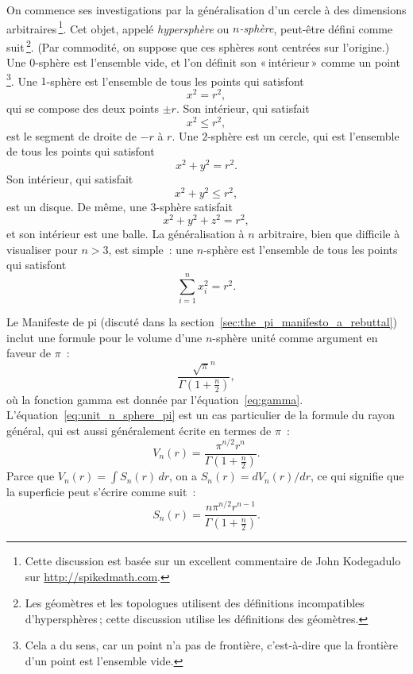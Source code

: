 On commence ses investigations par la généralisation d'un cercle à des dimensions arbitraires\,\footnote{Cette discussion est basée sur un excellent commentaire de John Kodegadulo sur \url{http://spikedmath.com}.}. Cet objet, appelé \emph{hypersphère} ou \emph{$n$-sphère}, peut-être défini comme suit\,\footnote{Les géomètres et les topologues utilisent des définitions incompatibles d'hypersphères\,; cette discussion utilise les définitions des géomètres.}. (Par commodité, on suppose que ces sphères sont centrées sur l'origine.) Une $0$-sphère est l'ensemble vide, et l'on définit son «\,intérieur\,» comme un point\,\footnote{Cela a du sens, car un point n'a pas de frontière, c'est-à-dire que la frontière d'un point est l'ensemble vide.}. Une $1$-sphère est l'ensemble de tous les points qui satisfont
\[
x^2 = r^2,
\]
qui se compose des deux points $\pm r$. Son intérieur, qui satisfait
\[
x^2 \leq r^2,
\]
est le segment de droite de $-r$ à $r$. Une $2$-sphère est un cercle, qui est l'ensemble de tous les points qui satisfont
\[
x^2 + y^2 = r^2.
\]
Son intérieur, qui satisfait
\[
x^2 + y^2 \leq r^2,
\]
est un disque. De même, une $3$-sphère satisfait
\[
x^2 + y^2 + z^2 = r^2,
\]
et son intérieur est une balle. La généralisation à $n$ arbitraire, bien que difficile à visualiser pour $n > 3$, est simple~: une $n$-sphère est l'ensemble de tous les points qui satisfont
\[
\sum_{i=1}^{n} x_i^2 = r^2.
\]

Le Manifeste de pi (discuté dans la section~\ref{sec:the_pi_manifesto_a_rebuttal}) inclut une formule pour le volume d'une $n$-sphère unité comme argument en faveur de $\pi$~:
\begin{equation}
\label{eq:unit_n_sphere_pi}
\frac{\sqrt{\pi}^{n} }{\Gamma(1 + \frac{n}{2})},
\end{equation}
où la fonction gamma est donnée par l'équation~\eqref{eq:gamma}. L'équation~\eqref{eq:unit_n_sphere_pi} est un cas particulier de la formule du rayon général, qui est aussi généralement écrite en termes de $\pi$~:
\begin{equation}
\label{eq:n_sphere_pi}
V_n(r) = \frac{\pi^{n/2} r^n}{\Gamma(1 + \frac{n}{2})}.
\end{equation}
Parce que $V_n(r) = \int S_n(r)\,dr$, on a $S_n(r) = dV_n(r)/dr$, ce qui signifie que la superficie peut s'écrire comme suit~:
\begin{equation}
\label{eq:n_sphere_pi_r}
S_n(r) = \frac{n \pi^{n/2} r^{n-1}}{\Gamma(1 + \frac{n}{2})}.
\end{equation}

